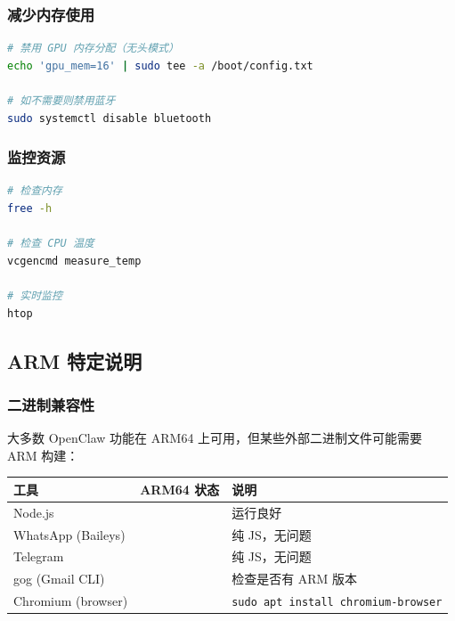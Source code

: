 \subsubsection{减少内存使用}


\begin{lstlisting}[language=bash]
# 禁用 GPU 内存分配（无头模式）
echo 'gpu_mem=16' | sudo tee -a /boot/config.txt

# 如不需要则禁用蓝牙
sudo systemctl disable bluetooth
\end{lstlisting}


\subsubsection{监控资源}


\begin{lstlisting}[language=bash]
# 检查内存
free -h

# 检查 CPU 温度
vcgencmd measure_temp

# 实时监控
htop
\end{lstlisting}


\hrulefill


\subsection{ARM 特定说明}


\subsubsection{二进制兼容性}


大多数 OpenClaw 功能在 ARM64 上可用，但某些外部二进制文件可能需要 ARM 构建：


\begin{table}[h]
\centering
\small
\begin{tabular}{|l|l|l|}
\hline
工具 & ARM64 状态 & 说明 \\
\hline
Node.js & \emoji{✅} & 运行良好 \\
\hline
WhatsApp (Baileys) & \emoji{✅} & 纯 JS，无问题 \\
\hline
Telegram & \emoji{✅} & 纯 JS，无问题 \\
\hline
gog (Gmail CLI) & \emoji{⚠} & 检查是否有 ARM 版本 \\
\hline
Chromium (browser) & \emoji{✅} & \texttt{sudo apt install chromium-browser} \\
\hline
\end{tabular}
\end{table}



